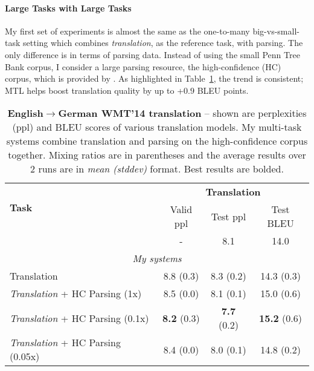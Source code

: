 \paragraph{Large Tasks with Large Tasks}
\label{subsub:ll}
My first set of experiments is almost the same as the one-to-many
big-vs-small-task setting
which combines {\it translation}, as the reference
task, with parsing. The only difference is in terms of parsing data. Instead of using the
small Penn Tree Bank corpus, I consider a large parsing resource, the
high-confidence (HC) corpus, which is provided by \citet{vinyals15grammar}.
As highlighted in Table~\ref{t:big_big_translation}, the
trend is consistent; MTL helps boost translation quality by up
to +$0.9$ BLEU points. 

\begin{table}[tbh!]
\centering
\begin{tabular}{l|c|c|c}
\multirow{ 2}{*}{\bf{Task}} & \multicolumn{3}{c}{{\bf Translation}}\\
  \cline{2-4}
  & Valid ppl & Test ppl & Test BLEU\\
  \hline
\citep{luong15attn} & - & 8.1 & 14.0 \\
  \hline
\multicolumn{4}{c}{{\it My systems}} \\
  \hline
Translation & 8.8 (0.3) & 8.3 (0.2) & 14.3 (0.3)\\
  \hline
{\it Translation} + HC Parsing (1x) &  8.5 (0.0) & 8.1 (0.1) & 15.0 (0.6) \\
{\it Translation} + HC Parsing (0.1x) &  {\bf 8.2} (0.3) & {\bf 7.7} (0.2) &
{\bf 15.2} (0.6)\\
{\it Translation} + HC Parsing (0.05x) &  8.4 (0.0) & 8.0 (0.1) & 14.8 (0.2) \\
\end{tabular}
\caption[Translation \& Large-Corpus parsing
results]{{\bf English$\rightarrow$German WMT'14 translation} -- shown are
perplexities (ppl) and BLEU scores of various translation models. My
multi-task systems combine translation and parsing on the
high-confidence corpus together. Mixing
ratios are in parentheses and the average results over 2 runs are in {\it
mean (stddev)} format. Best results are bolded.}
\label{t:big_big_translation}
\end{table}


